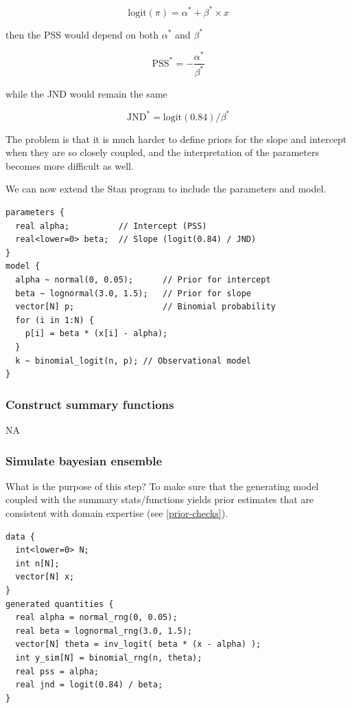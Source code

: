 \documentclass[11pt, oneside, openany]{scrbook}
\begin{document}
\[
\mathrm{logit}(\pi) = \alpha^* + \beta^* \times x
\]

then the PSS would depend on both \(\alpha^*\) and \(\beta^*\)

\[
\mathrm{PSS}^* = -\frac{\alpha^*}{\beta^*}
\]

while the JND would remain the same

\[
\mathrm{JND}^* = \mathrm{logit}(0.84)/\beta^*
\]

The problem is that it is much harder to define priors for the slope and intercept when they are so closely coupled, and the interpretation of the parameters becomes more difficult as well.

We can now extend the Stan program to include the parameters and model.


\begin{verbatim}
parameters {
  real alpha;          // Intercept (PSS)
  real<lower=0> beta;  // Slope (logit(0.84) / JND)
}
model {
  alpha ~ normal(0, 0.05);      // Prior for intercept
  beta ~ lognormal(3.0, 1.5);   // Prior for slope
  vector[N] p;                  // Binomial probability
  for (i in 1:N) {
    p[i] = beta * (x[i] - alpha);
  }
  k ~ binomial_logit(n, p); // Observational model
}
\end{verbatim}


\hypertarget{construct-summary-functions}{%
\subsubsection{Construct summary functions}\label{construct-summary-functions}}

NA

\hypertarget{simulate-bayesian-ensemble}{%
\subsubsection{Simulate bayesian ensemble}\label{simulate-bayesian-ensemble}}

What is the purpose of this step? To make sure that the generating model coupled with the summary stats/functions yields prior estimates that are consistent with domain expertise (see \ref{prior-checks}).


\begin{verbatim}
data {
  int<lower=0> N;
  int n[N];
  vector[N] x;
}
generated quantities {
  real alpha = normal_rng(0, 0.05);
  real beta = lognormal_rng(3.0, 1.5);
  vector[N] theta = inv_logit( beta * (x - alpha) );
  int y_sim[N] = binomial_rng(n, theta);
  real pss = alpha;
  real jnd = logit(0.84) / beta;
}
\end{verbatim}
\end{document}
